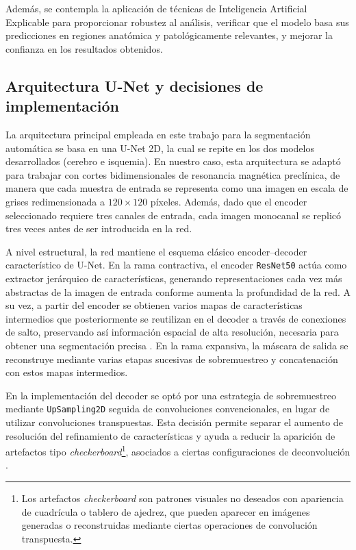 Además, se contempla la aplicación de técnicas de Inteligencia Artificial Explicable para proporcionar robustez al análisis, verificar que el modelo basa sus predicciones en regiones anatómica y patológicamente relevantes, y mejorar la confianza en los resultados obtenidos.

\subsection{Arquitectura U-Net y decisiones de implementación}

La arquitectura principal empleada en este trabajo para la segmentación automática se basa en una U-Net 2D, la cual se repite en los dos modelos desarrollados (cerebro e isquemia). En nuestro caso, esta arquitectura se adaptó para trabajar con cortes bidimensionales de resonancia magnética preclínica, de manera que cada muestra de entrada se representa como una imagen en escala de grises redimensionada a \(120 \times 120\) píxeles. Además, dado que el encoder seleccionado requiere tres canales de entrada, cada imagen monocanal se replicó tres veces antes de ser introducida en la red.

A nivel estructural, la red mantiene el esquema clásico encoder--decoder característico de U-Net. En la rama contractiva, el encoder \texttt{ResNet50} actúa como extractor jerárquico de características, generando representaciones cada vez más abstractas de la imagen de entrada conforme aumenta la profundidad de la red. A su vez, a partir del encoder se obtienen varios mapas de características intermedios que posteriormente se reutilizan en el decoder a través de conexiones de salto, preservando así información espacial de alta resolución, necesaria para obtener una segmentación precisa \citep{ronneberger2015unet}. En la rama expansiva, la máscara de salida se reconstruye mediante varias etapas sucesivas de sobremuestreo y concatenación con estos mapas intermedios.

En la implementación del decoder se optó por una estrategia de sobremuestreo mediante \texttt{UpSampling2D} seguida de convoluciones convencionales, en lugar de utilizar convoluciones transpuestas. Esta decisión permite separar el aumento de resolución del refinamiento de características y ayuda a reducir la aparición de artefactos tipo \textit{checkerboard}\footnote{
Los artefactos \textit{checkerboard} son patrones visuales no deseados con apariencia de cuadrícula o tablero de ajedrez, que pueden aparecer en imágenes generadas o reconstruidas mediante ciertas operaciones de convolución transpuesta.
}, asociados a ciertas configuraciones de deconvolución \citep{odena2016deconvolution}.

